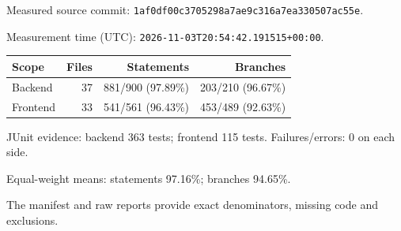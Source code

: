 Measured source commit: \texttt{1af0df00c3705298a7ae9c316a7ea330507ac55e}.\par
Measurement time (UTC): \texttt{2026-11-03T20:54:42.191515+00:00}.\par
\begin{tabularx}{\textwidth}{@{}l r r r@{}}\toprule Scope & Files & Statements & Branches\\\midrule
Backend & 37 & 881/900 (97.89\%) & 203/210 (96.67\%)\\
Frontend & 33 & 541/561 (96.43\%) & 453/489 (92.63\%)\\
\bottomrule\end{tabularx}
JUnit evidence: backend 363 tests; frontend 115 tests. Failures/errors: 0 on each side.\par
Equal-weight means: statements 97.16\%; branches 94.65\%.\par
The manifest and raw reports provide exact denominators, missing code and exclusions.
